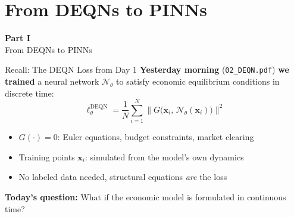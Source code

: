 \documentclass[aspectratio=169,11pt]{beamer}
\newcommand{\emphc}[1]{\textcolor{harvardcrimson}{#1}}
\newcommand{\x}{\bm{x}}
\begin{document}

\section{From DEQNs to PINNs}

\begin{frame}{}
\vfill
\begin{center}
{\Huge \textcolor{uzhblue}{\textbf{Part I}}}\\[12pt]
{\LARGE From DEQNs to PINNs}
\end{center}
\vfill
\end{frame}

\begin{frame}{Recall: The DEQN Loss from Day 1}
\textbf{Yesterday morning} (\texttt{02\_DEQN.pdf}) \textbf{we trained} a neural network $\mathcal{N}_\theta$ to satisfy
economic equilibrium conditions in \emphc{discrete time}:
\[
\boxed{
\ell_\theta^{\text{DEQN}} = \frac{1}{N}\sum_{i=1}^{N}
\bigl\|G\bigl(\x_i,\,\mathcal{N}_\theta(\x_i)\bigr)\bigr\|^2
}
\]

\vspace{0.3em}
\begin{itemize}
    \item $G(\cdot) = 0$: Euler equations, budget constraints, market clearing
    \item Training points $\x_i$: simulated from the model's own dynamics
    \item \emphc{No labeled data needed}, structural equations \emph{are} the loss
\end{itemize}

\vspace{0.5em}
\textbf{Today's question:}
What if the economic model is formulated in \emphc{continuous time}?
\end{frame}
\end{document}
